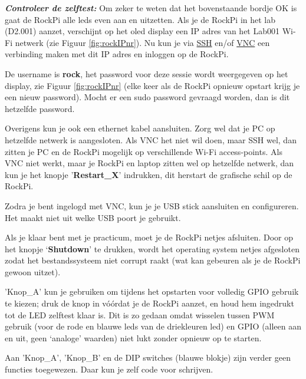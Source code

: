\textbf{\textit{Controleer de zelftest:}} Om zeker te weten dat het bovenstaande bordje OK is gaat de RockPi alle leds even aan en uitzetten. \newline
Als je de RockPi in het lab (D2.001) aanzet, verschijnt op het oled display 
een IP adres van het Lab001 Wi-Fi netwerk (zie Figuur \ref{fig:rockIPnr}). %
Nu kun je via \hyperlink{chp:ssh}{SSH} en/of \hyperlink{chp:vnc}{VNC} een verbinding maken met dit IP adres en inloggen op de RockPi.

De username is \textbf{rock}, het password voor deze sessie wordt weergegeven op het display, zie Figuur \ref{fig:rockIPnr} (elke keer als de RockPi opnieuw opstart krijg je een nieuw password). Mocht er een sudo password gevraagd worden, dan is dit hetzelfde password.

Overigens kun je ook een ethernet kabel aansluiten.
Zorg wel dat je PC op hetzelfde netwerk is aangesloten. Als VNC het niet wil doen, maar SSH wel, dan zitten je PC en de RockPi mogelijk op verschillende Wi-Fi access-points. Als VNC niet werkt, maar je RockPi en laptop zitten wel op hetzelfde netwerk, dan kun je het knopje '\textbf{Restart\_X}' indrukken, dit herstart de grafische schil op de RockPi.

Zodra je bent ingelogd met VNC, kun je je USB stick aansluiten en configureren. Het maakt niet uit welke USB poort je gebruikt. 

Als je klaar bent met je practicum, moet je de RockPi netjes afsluiten. Door op het knopje ‘\textbf{Shutdown}’ te drukken, wordt het operating system netjes afgesloten zodat het bestandssysteem niet corrupt raakt (wat kan gebeuren als je de RockPi gewoon uitzet).

'Knop\_A' kun je gebruiken om tijdens het opstarten voor volledig GPIO gebruik te kiezen; druk de knop in vóórdat je de RockPi aanzet, en houd hem ingedrukt tot de LED zelftest klaar is. Dit is zo gedaan omdat wisselen tussen PWM gebruik (voor de rode en blauwe leds van de driekleuren led) en GPIO (alleen aan en uit, geen ‘analoge’ waarden) niet lukt zonder opnieuw op te starten.

Aan 'Knop\_A', 'Knop\_B' en de DIP switches (blauwe blokje) zijn verder geen functies toegewezen. Daar kun je zelf code voor schrijven.

